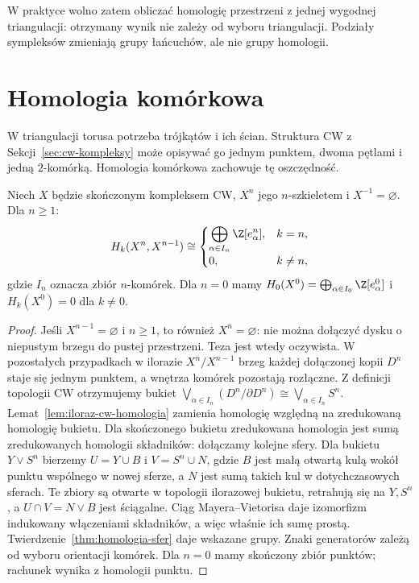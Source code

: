 W praktyce wolno zatem obliczać
homologię przestrzeni z jednej
wygodnej triangulacji: otrzymany
wynik nie zależy od wyboru
triangulacji. Podziały sympleksów
zmieniają grupy łańcuchów,
ale nie grupy homologii.

\section{Homologia komórkowa}
\label{sec:homologia-komorkowa}

W triangulacji torusa potrzeba
trójkątów i ich ścian. Struktura
CW z Sekcji~\ref{sec:cw-kompleksy}
może opisywać go jednym punktem,
dwoma pętlami i jedną
$2$-komórką. Homologia komórkowa
zachowuje tę oszczędność.

\begin{twierdzenie}
\label{thm:warstwa-komorek}
Niech $X$ będzie skończonym
kompleksem CW, $X^n$ jego
$n$-szkieletem i $X^{-1}=\varnothing$.
Dla $n\geq1$:
\[
 H_k(X^n,X^{n-1})
 \cong
 \begin{cases}
 \displaystyle\bigoplus_{\alpha\in I_n}\Z[e_\alpha^n],
 &k=n,\\[3pt]0,&k\ne n,
 \end{cases}
\]
gdzie $I_n$ oznacza zbiór $n$-komórek.
Dla $n=0$ mamy
$H_0(X^0)=\bigoplus_{\alpha\in I_0}\Z[e_\alpha^0]$
i $H_k(X^0)=0$ dla $k\ne0$.
\end{twierdzenie}
\begin{proof}
Jeśli $X^{n-1}=\varnothing$ i $n\geq1$, to również $X^n=\varnothing$:
nie można dołączyć dysku o niepustym brzegu do pustej przestrzeni.
Teza jest wtedy oczywista. W pozostałych przypadkach
w ilorazie $X^n/X^{n-1}$
brzeg każdej dołączonej kopii
$D^n$ staje się jednym punktem,
a wnętrza komórek pozostają
rozłączne. Z definicji topologii
CW otrzymujemy bukiet
$\bigvee_{\alpha\in I_n}
(D^n/\partial D^n)\cong
\bigvee_{\alpha\in I_n}S^n$.
Lemat~\ref{lem:iloraz-cw-homologia}
zamienia homologię względną
na zredukowaną homologię bukietu.
Dla skończonego bukietu
zredukowana homologia jest sumą
zredukowanych homologii składników:
dołączamy kolejne sfery. Dla bukietu $Y\vee S^n$
bierzemy $U=Y\cup B$ i $V=S^n\cup N$, gdzie $B$ jest małą
otwartą kulą wokół punktu wspólnego w nowej sferze, a $N$
jest sumą takich kul w dotychczasowych sferach.
Te zbiory są otwarte w topologii ilorazowej bukietu,
retrahują się na $Y,S^n$, a $U\cap V=N\vee B$ jest ściągalne.
Ciąg Mayera--Vietorisa daje izomorfizm indukowany włączeniami
składników, a więc właśnie ich sumę prostą.
Twierdzenie~\ref{thm:homologia-sfer}
daje wskazane grupy.
Znaki generatorów zależą
od wyboru orientacji komórek.
Dla $n=0$ mamy skończony
zbiór punktów; rachunek wynika
z homologii punktu.
\end{proof}

